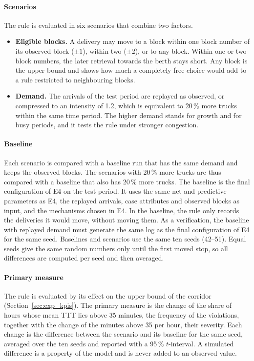 \paragraph{Scenarios}
The rule is evaluated in six scenarios that combine two factors.
\begin{itemize}[itemsep=2pt,topsep=4pt]
\item \textbf{Eligible blocks.} A delivery may move to a block within one block
number of its observed block ($\pm 1$), within two ($\pm 2$), or to any block.
Within one or two block numbers, the later retrieval towards the berth stays
short. Any block is the upper bound and shows how much a completely free choice
would add to a rule restricted to neighbouring blocks.
\item \textbf{Demand.} The arrivals of the test period are replayed as observed,
or compressed to an intensity of 1.2, which is equivalent to 20\,\% more trucks
within the same time period. The higher demand stands for growth and for busy
periods, and it tests the rule under stronger congestion.
\end{itemize}

\paragraph{Baseline}
Each scenario is compared with a baseline run that has the same demand and keeps
the observed blocks. The scenarios with 20\,\% more trucks are thus compared with a
baseline that also has 20\,\% more trucks. The baseline is the final configuration
of E4 on the test period. It uses the same net and predictive parameters as E4, the
replayed arrivals, case attributes and observed blocks as input, and the mechanisms
chosen in E4. In the baseline, the rule only records the deliveries it would move,
without moving them. As a verification, the baseline with replayed demand must
generate the same log as the final configuration of E4 for the same seed. Baselines
and scenarios use the same ten seeds (42--51). Equal seeds give the same random
numbers only until the first moved stop, so all differences are computed per seed
and then averaged.

\paragraph{Primary measure}
The rule is evaluated by its effect on the upper bound of the corridor
(Section~\ref{sec:exp_kpis}). The primary measure is the change of the share of
hours whose mean TTT lies above 35 minutes, the frequency of the violations, together
with the change of the minutes above 35 per hour, their severity. Each change is the difference between the scenario and its
baseline for the same seed, averaged over the ten seeds and reported with a
95\,\% $t$-interval. A simulated difference is a property of the model and is
never added to an observed value.

